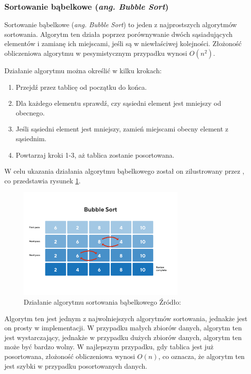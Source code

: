 \subsubsection*{Sortowanie bąbelkowe (\textit{ang. Bubble Sort})}
Sortowanie bąbelkowe (\textit{ang. Bubble Sort}) to jeden z najprostszych algorytmów sortowania. Algorytm ten działa poprzez porównywanie dwóch sąsiadujących elementów i zamianę ich miejscami, jeśli są w niewłaściwej kolejności. Złożoność obliczeniowa algorytmu w pesymistycznym przypadku wynosi $O(n^2)$.

Działanie algorytmu można określić w kilku krokach:
\begin{enumerate}
  \item Przejdź przez tablicę od początku do końca.
  \item Dla każdego elementu sprawdź, czy sąsiedni element jest mniejszy od obecnego.
  \item Jeśli sąsiedni element jest mniejszy, zamień miejscami obecny element z sąsiednim.
  \item Powtarzaj kroki 1-3, aż tablica zostanie posortowana.
\end{enumerate}

W celu ukazania działania algorytmu bąbelkowego został on zilustrowany przez \cite{bubble_sort}, co przedstawia rysunek \ref{fig:bubble_sort}.

\begin{figure}[H]
  \centering
  \includegraphics[width=0.75\textwidth]{Figures/bubble_sort.png}
  \caption{Działanie algorytmu sortowania bąbelkowego Źródło: \cite{bubble_sort}}
  \label{fig:bubble_sort}
\end{figure}

Algorytm ten jest jednym z najwolniejszych algorytmów sortowania, jednakże jest on prosty w implementacji. W przypadku małych zbiorów danych, algorytm ten jest wystarczający, jednakże w przypadku dużych zbiorów danych, algorytm ten może być bardzo wolny. W najlepszym przypadku, gdy tablica jest już posortowana, złożoność obliczeniowa wynosi $O(n)$, co oznacza, że algorytm ten jest szybki w przypadku posortowanych danych.

